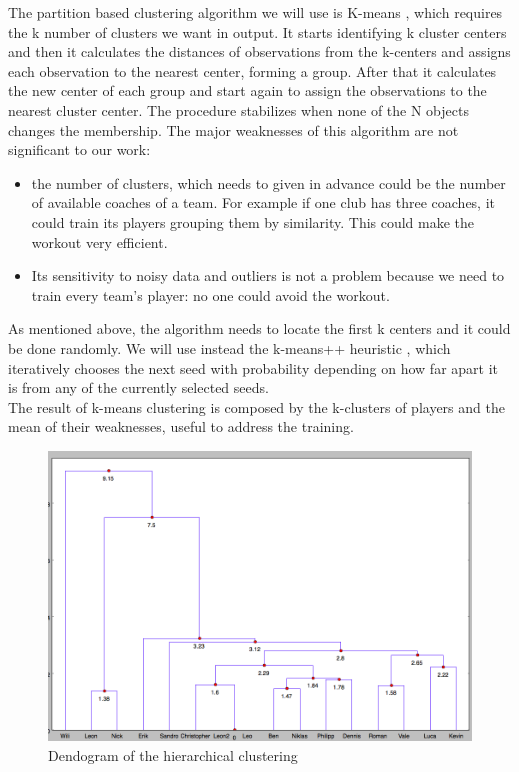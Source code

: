 \documentclass{acm_proc_article-sp-sigmod07}
\begin{document}
The partition based clustering algorithm we will use is K-means \cite{forgy1965cluster}, which requires the k number of clusters we want in output. It starts identifying k cluster centers and then it calculates the distances of observations from the k-centers and assigns each observation to the nearest center, forming a group. After that it calculates the new center of each group and start again to assign the observations to the nearest cluster center. The procedure stabilizes when none of the N objects changes the membership.  The major weaknesses of this algorithm are not significant to our work:
\begin{itemize}
  \item the number of clusters, which needs to given in advance could be the number of available coaches of a team. For example if one club has three coaches, it could train its players grouping them by similarity. This could make the workout very efficient.
  \item Its sensitivity to noisy data and outliers is not a problem because we need to train every team’s player: no one could avoid the workout.
\end{itemize}
As mentioned above, the algorithm needs to locate the first k centers and it could be done randomly. We will use instead the k-means++ heuristic \cite{arthur2007k}, which iteratively chooses the next seed with probability depending on how far apart it is from any of the currently selected seeds.\\
The result of k-means clustering is composed by the k-clusters of players and the mean of their weaknesses, useful to address the training.

\begin{figure}
\includegraphics[scale=0.24]{arg}
\caption{Dendogram of the hierarchical clustering}
\end{figure}
\end{document}
